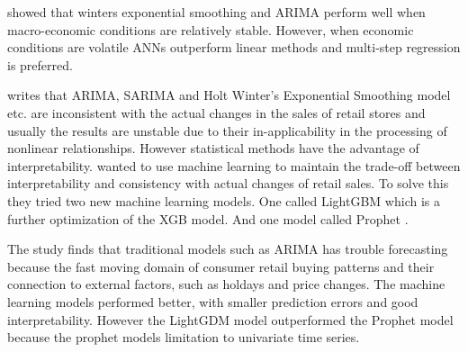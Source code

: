 \cite{Chu2003} showed that winters exponential smoothing and ARIMA perform well when macro-economic
conditions are relatively stable. However, when economic conditions are volatile
ANNs outperform linear methods and multi-step regression is preferred.




\cite{Weng2020} writes that ARIMA, SARIMA and Holt Winter's
Exponential Smoothing model etc. are inconsistent with the actual changes in the sales
of retail stores and usually the results are unstable due to their in-applicability
in the processing of nonlinear relationships.
However statistical methods have the advantage of interpretability.
\cite{Bowen2020} wanted to use machine learning to maintain
the trade-off between interpretability and consistency with actual
changes of retail sales.
To solve this they tried two new machine learning models.
One called LightGBM which is a further optimization of the XGB model.
And one model called Prophet \citep{Zunic2020}.

The study finds that traditional models such as ARIMA has trouble forecasting
because the fast moving domain of consumer retail buying patterns and 
their connection to external factors, such as holdays and price changes.
The machine learning models performed better, with smaller prediction errors
and good interpretability.
However the LightGDM model outperformed the Prophet model because the prophet
models limitation to univariate time series.

